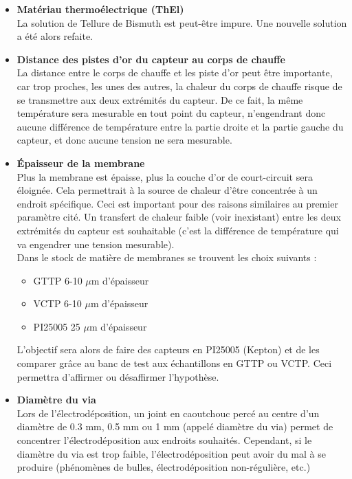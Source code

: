 \begin{itemize}
    \item \textbf{Matériau thermoélectrique (ThEl)}\\
          La solution de Tellure de Bismuth est peut-être impure. Une nouvelle solution a été alors refaite.
          
    \item \textbf{Distance des pistes d'or du capteur au corps de chauffe}\\
          La distance entre le corps de chauffe et les piste d'or peut être importante, car trop proches, les unes des autres, la chaleur du corps
          de chauffe risque de se transmettre aux deux extrémités du capteur. De ce fait, la même température sera mesurable en tout point du
          capteur, n'engendrant donc aucune différence de température entre la partie droite et la partie gauche du \gls{capteur}, et donc aucune
          tension ne sera mesurable.\\
          
    \item \textbf{Épaisseur de la membrane} \\
          Plus la membrane est épaisse, plus la couche d'or de court-circuit sera éloignée. Cela permettrait à la source de chaleur d'être concentrée
          à un endroit spécifique. Ceci est important pour des raisons similaires au premier paramètre cité. Un transfert de chaleur faible (voir
          inexistant) entre les deux extrémités du \gls{capteur} est souhaitable (c'est la différence de température qui va engendrer une tension
          mesurable). \\
          
          Dans le stock de matière de membranes se trouvent les choix suivants :
          \begin{itemize}
              \item GTTP 6-10 $\mu$m d'épaisseur
              \item VCTP 6-10 $\mu$m d'épaisseur
              \item PI25005 25 $\mu$m d'épaisseur
          \end{itemize}
          L'objectif sera alors de faire des capteurs en PI25005 (Kepton) et de les comparer grâce au banc de test aux échantillons en GTTP ou VCTP.
          Ceci permettra d'affirmer ou désaffirmer l'hypothèse.\\
          
    \item \textbf{Diamètre du via}\\
          Lors de l'électrodéposition, un joint en caoutchouc percé au centre d'un diamètre de 0.3 mm, 0.5 mm ou 1 mm (appelé diamètre du via) permet de concentrer
          l'électrodéposition aux endroits souhaités. Cependant, si le diamètre du via est trop faible, l'électrodéposition peut avoir du mal à
          se produire (phénomènes de bulles, électrodéposition non-régulière, etc.)\\
          

\end{itemize}
